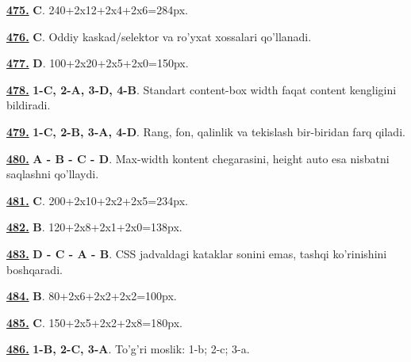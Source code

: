 \documentclass[10pt,a4paper,oneside]{article}
\begin{document}
\noindent\hyperlink{q475}{\textbf{475.}} \textbf{C}.  240+2x12+2x4+2x6=284px.
\par\vspace{3mm}
\noindent\hyperlink{q476}{\textbf{476.}} \textbf{C}.  Oddiy kaskad/selektor va ro'yxat xossalari qo'llanadi.
\par\vspace{3mm}
\noindent\hyperlink{q477}{\textbf{477.}} \textbf{D}.  100+2x20+2x5+2x0=150px.
\par\vspace{3mm}
\noindent\hyperlink{q478}{\textbf{478.}} \textbf{1-C, 2-A, 3-D, 4-B}.  Standart content-box width faqat content kengligini bildiradi.
\par\vspace{3mm}
\noindent\hyperlink{q479}{\textbf{479.}} \textbf{1-C, 2-B, 3-A, 4-D}.  Rang, fon, qalinlik va tekislash bir-biridan farq qiladi.
\par\vspace{3mm}
\noindent\hyperlink{q480}{\textbf{480.}} \textbf{A - B - C - D}.  Max-width kontent chegarasini, height auto esa nisbatni saqlashni qo'llaydi.
\par\vspace{3mm}
\noindent\hyperlink{q481}{\textbf{481.}} \textbf{C}.  200+2x10+2x2+2x5=234px.
\par\vspace{3mm}
\noindent\hyperlink{q482}{\textbf{482.}} \textbf{B}.  120+2x8+2x1+2x0=138px.
\par\vspace{3mm}
\noindent\hyperlink{q483}{\textbf{483.}} \textbf{D - C - A - B}.  CSS jadvaldagi kataklar sonini emas, tashqi ko'rinishini boshqaradi.
\par\vspace{3mm}
\noindent\hyperlink{q484}{\textbf{484.}} \textbf{B}.  80+2x6+2x2+2x2=100px.
\par\vspace{3mm}
\noindent\hyperlink{q485}{\textbf{485.}} \textbf{C}.  150+2x5+2x2+2x8=180px.
\par\vspace{3mm}
\noindent\hyperlink{q486}{\textbf{486.}} \textbf{1-B, 2-C, 3-A}.  To'g'ri moslik: 1-b; 2-c; 3-a.
\end{document}
